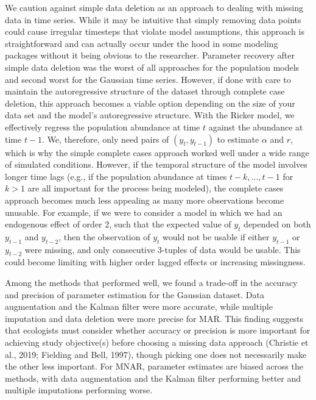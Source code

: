 \documentclass{article}
\begin{document}
We caution against simple data deletion as an approach to dealing with missing data in time series. While it may be intuitive that simply removing data points could cause irregular timesteps that violate model assumptions, this approach is straightforward and can actually occur under the hood in some modeling packages without it being obvious to the researcher. Parameter recovery after simple data deletion was the worst of all approaches for the population models and second worst for the Gaussian time series. However, if done with care to maintain the autoregressive structure of the dataset through complete case deletion, this approach becomes a viable option depending on the size of your data set and the model's autoregressive structure. With the Ricker model, we effectively regress the population abundance at time $t$ against the abundance at time $t-1$. We, therefore, only need pairs of $(y_t, y_{t-1})$ to estimate $\alpha$ and $r$, which is why the simple complete cases approach worked well under a wide range of simulated conditions. However, if the temporal structure of the model involves longer time lags (e.g., if the population abundance at times $t-k,...,t-1$ for $k > 1$ are all important for the process being modeled), the complete cases approach becomes much less appealing as many more observations become unusable. For example, if we were to consider a model in which we had an endogenous effect of order 2, such that the expected value of $y_t$ depended on both $y_{t-1}$ and $y_{t-2}$, then the observation of $y_t$ would not be usable if either $y_{t-1}$ or $y_{t-2}$ were missing, and only consecutive 3-tuples of data would be usable. This could become limiting with higher order lagged effects or increasing missingness.




Among the methods that performed well, we found a trade-off in the accuracy and precision of parameter estimation for the Gaussian dataset. Data augmentation and the Kalman filter were more accurate, while multiple imputation and data deletion were more precise for MAR. This finding suggests that ecologists must consider whether accuracy or precision is more important for achieving study objective(s) before choosing a missing data approach (Christie et al., 2019; Fielding and Bell, 1997), though picking one does not necessarily make the other less important. For MNAR, parameter estimates are biased across the methods, with data augmentation and the Kalman filter performing better and multiple imputations performing worse. 
\end{document}
